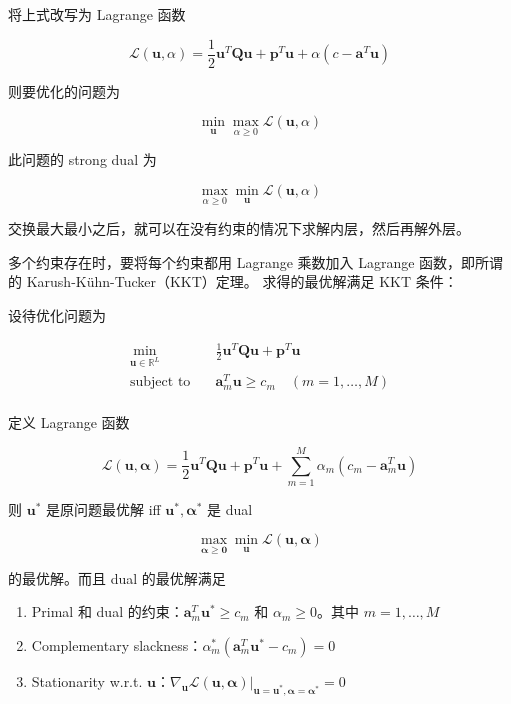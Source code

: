 \documentclass[a4paper]{article}
\begin{document}
将上式改写为 Lagrange 函数

$$\mathcal{L}(\mathbf{u}, \alpha) = \frac{1}{2}\mathbf{u}^{T}\mathbf{Qu} + \mathbf{p}^{T}\mathbf{u} + \alpha(c - \mathbf{a}^{T}\mathbf{u})$$

则要优化的问题为

$$\min_{\mathbf{u}} \max_{\alpha \ge 0} \mathcal{L}(\mathbf{u}, \alpha)$$

此问题的 strong dual 为

$$\max_{\alpha \ge 0} \min_{\mathbf{u}} \mathcal{L}(\mathbf{u}, \alpha)$$

交换最大最小之后，就可以在没有约束的情况下求解内层，然后再解外层。

多个约束存在时，要将每个约束都用 Lagrange 乘数加入 Lagrange 函数，即所谓的 Karush-Kühn-Tucker（KKT）定理。
求得的最优解满足 KKT 条件：

设待优化问题为

\begin{equation}
\begin{aligned}
\min_{\mathbf{u} \in \mathbb{R}^{L}} \quad& \frac{1}{2}\mathbf{u}^{T}\mathbf{Qu} + \mathbf{p}^{T}\mathbf{u} \\
\text{subject to} \quad& \mathbf{a}_m^{T}\mathbf{u} \ge c_m \quad (m = 1, \dots, M)\\
\end{aligned}
\end{equation}

定义 Lagrange 函数

$$\mathcal{L}(\mathbf{u}, \bm{\alpha}) = \frac{1}{2}\mathbf{u}^{T}\mathbf{Qu} + \mathbf{p}^{T}\mathbf{u} + \sum_{m=1}^{M}\alpha_m(c_m - \mathbf{a}_m^{T}\mathbf{u})$$

则 $\mathbf{u}^{*}$ 是原问题最优解 iff $\mathbf{u}^{*}, \mathbf{\alpha}^{*}$ 是 dual

$$\max_{\bm{\alpha} \ge \bm{0}} \min_{\mathbf{u}} \mathcal{L}(\mathbf{u}, \bm{\alpha})$$

的最优解。而且 dual 的最优解满足
\begin{enumerate}
  \item Primal 和 dual 的约束：$\mathbf{a}_m^{T}\mathbf{u}^{*} \ge c_m$ 和 $\alpha_m \ge 0$。其中 $m=1,\dots,M$
  \item Complementary slackness：$\alpha_m^{*}(\mathbf{a}_m^{T}\mathbf{u}^{*} - c_m) = 0$
  \item Stationarity w.r.t. $\mathbf{u}$：$\nabla_{\mathbf{u}}\mathcal{L}(\mathbf{u}, \bm{\alpha})|_{\mathbf{u}=\mathbf{u}^{*}, \bm{\alpha}=\bm{\alpha}^{*}} = 0$
\end{enumerate}
\end{document}
